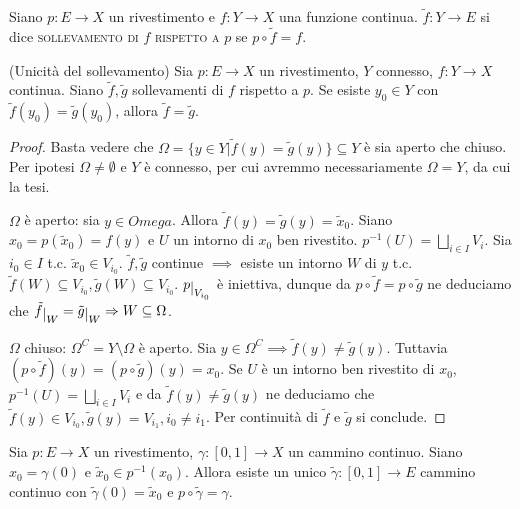 \begin{defn}
  Siano $p: E \longrightarrow X$ un rivestimento e $f: Y \longrightarrow X$ una funzione continua. $\tilde{f}: Y \longrightarrow E$ si dice \textsc{sollevamento di $f$ rispetto a $p$} se $p \circ \tilde{f}=f$.
\end{defn}

\begin{prop} \label{unic_soll}
  (Unicità del sollevamento)
  Sia $p: E \longrightarrow X$ un rivestimento, $Y$ connesso, $f: Y \longrightarrow X$ continua. Siano $\tilde{f}, \tilde{g}$ sollevamenti di $f$ rispetto a $p$. Se esiste $y_0 \in Y$ con $\tilde{f}(y_0)=\tilde{g}(y_0)$, allora $\tilde{f}=\tilde{g}$.
\end{prop}

\begin{proof}
  Basta vedere che $\Omega=\{ y \in Y | \tilde{f}(y)=\tilde{g}(y)\} \subseteq Y$ è sia aperto che chiuso. Per ipotesi $\Omega \not= \emptyset$ e $Y$ è connesso, per cui avremmo necessariamente $\Omega=Y$, da cui la tesi.

  $\Omega$ è aperto: sia $y \in Omega$. Allora $\tilde{f}(y)=\tilde{g}(y)=\tilde{x}_0$. Siano $x_0=p(\tilde{x}_0)=f(y)$ e $U$ un intorno di $x_0$ ben rivestito.
  $\displaystyle p^{-1}(U)=\bigsqcup_{i \in I} V_i$. Sia $i_0 \in I$ t.c. $\tilde{x}_0 \in V_{i_0}$.
  $\tilde{f}, \tilde{g}$ continue $\implies$ esiste un intorno $W$ di $y$ t.c. $\tilde{f}(W) \subseteq V_{i_0}, \tilde{g}(W) \subseteq V_{i_0}$.
  $p \restrict{V_{i_0}}$ è iniettiva, dunque da $p \circ \tilde{f}=p \circ \tilde{g}$ ne deduciamo che $\tilde{f} \restrict{W}=\tilde{g} \restrict{W} \implies W \subseteq \Omega$.

  $\Omega$ chiuso: $\Omega^C=Y \setminus \Omega$ è aperto. Sia $y \in \Omega^C \implies \tilde{f}(y) \not= \tilde{g}(y)$. Tuttavia $(p \circ \tilde{f})(y)=(p \circ \tilde{g})(y)=x_0$.
  Se $U$ è un intorno ben rivestito di $x_0$, $\displaystyle p^{-1}(U)=\bigsqcup_{i \in I} V_i$ e da $\tilde{f}(y) \not= \tilde{g}(y)$ ne deduciamo che $\tilde{f}(y) \in V_{i_0}, \tilde{g}(y)=V_{i_1}, i_0 \not= i_1$. Per continuità di $\tilde{f}$ e $\tilde{g}$ si conclude.
\end{proof}

\begin{thm}
  Sia $p:E \longrightarrow X$ un rivestimento, $\gamma:[0, 1] \longrightarrow X$ un cammino continuo. Siano $x_0=\gamma(0)$ e $\tilde{x}_0 \in p^{-1}(x_0)$.
  Allora esiste un unico $\tilde{\gamma}:[0, 1] \longrightarrow E$ cammino continuo con $\tilde{\gamma}(0)=\tilde{x}_0$ e $p \circ \tilde{\gamma}=\gamma$.
\end{thm}

